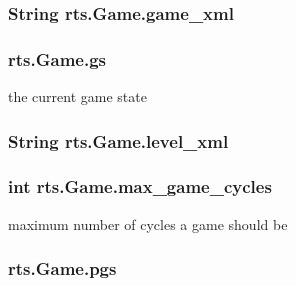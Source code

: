 \label{classrts_1_1_game_a6fd172beb62474482c7739783e014614}
\hypertarget{classrts_1_1_game_a3db05d833106694ceb71d5abb8a4a252}{
\subsubsection[{game\_\-xml}]{\setlength{\rightskip}{0pt plus 5cm}String {\bf rts.Game.game\_\-xml}}}
\label{classrts_1_1_game_a3db05d833106694ceb71d5abb8a4a252}
\hypertarget{classrts_1_1_game_a81f22c65414664ca512616faf90ecc3a}{
\subsubsection[{gs}]{ {\bf rts.Game.gs}}}
\label{classrts_1_1_game_a81f22c65414664ca512616faf90ecc3a}
the current game state \hypertarget{classrts_1_1_game_a66bb2bee9166c825a1a9e01446dc8bce}{
\subsubsection[{level\_\-xml}]{\setlength{\rightskip}{0pt plus 5cm}String {\bf rts.Game.level\_\-xml}}}
\label{classrts_1_1_game_a66bb2bee9166c825a1a9e01446dc8bce}
\hypertarget{classrts_1_1_game_a61c921b1223339a895064a209bf33aa7}{
\subsubsection[{max\_\-game\_\-cycles}]{\setlength{\rightskip}{0pt plus 5cm}int {\bf rts.Game.max\_\-game\_\-cycles}}}
\label{classrts_1_1_game_a61c921b1223339a895064a209bf33aa7}
maximum number of cycles a game should be \hypertarget{classrts_1_1_game_ae331647ec1f54d6a50a02565fb3d6c20}{
\subsubsection[{pgs}]{ {\bf rts.Game.pgs}}}
